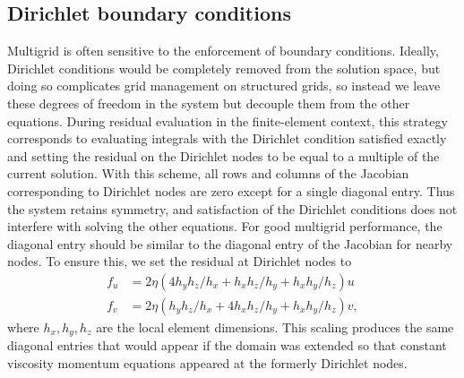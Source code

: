 \documentclass[3p]{elsarticle}
\begin{document}

\subsection{Dirichlet boundary conditions}\label{ssec:dirichlet}
Multigrid is often sensitive to the enforcement of boundary conditions.  Ideally, Dirichlet
conditions would be completely removed from the solution space, but doing so complicates grid
management on structured grids, so instead we leave these degrees of freedom in the system but
decouple them from the other equations.  During residual evaluation in the finite-element context,
this strategy corresponds to evaluating integrals with the Dirichlet condition satisfied exactly and setting
the residual on the Dirichlet nodes to be equal to a multiple of the current solution.  With this
scheme, all rows and columns of the Jacobian corresponding to Dirichlet nodes are zero except for a
single diagonal entry. Thus the system retains symmetry, and satisfaction of the Dirichlet conditions
does not interfere with solving the other equations.  For good multigrid performance, the diagonal
entry should be similar to the diagonal entry of the Jacobian for nearby nodes.  To ensure this, we
set the residual at Dirichlet nodes to
\begin{align}\label{eq:dirichlet-scale}
  f_u &= 2 \eta (4 h_yh_z/h_x + h_x h_z/h_y + h_x h_y/h_z) u \\
  f_v &= 2 \eta (h_yh_z/h_x + 4 h_x h_z/h_y + h_x h_y/h_z) v,
\end{align}
where $h_x,h_y,h_z$ are the local element dimensions.  This scaling produces the same diagonal
entries that would appear if the domain was extended so that constant viscosity momentum equations
appeared at the formerly Dirichlet nodes.
\end{document}
